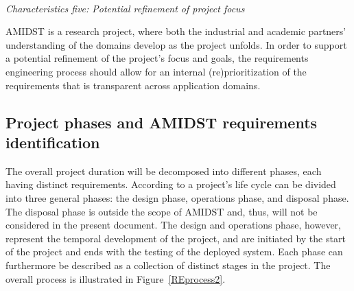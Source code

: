 
\ \\
\noindent \emph{Characteristics five: Potential refinement of project focus}
\label{sec:characteristic5}

AMIDST is a research project, where both the industrial and academic partners' understanding of the domains develop as
the project unfolds. In order to support a potential refinement of the project's focus and goals, the requirements
engineering process should allow for an internal (re)prioritization of the requirements that is transparent across
application domains.    





\subsection{Project phases and AMIDST requirements identification }


The overall project duration will be decomposed into different phases, each having distinct requirements. According to
\cite{Eig09} a project's life cycle can be divided into three general phases: the design phase, operations phase, and
disposal phase. The disposal phase is outside the scope of AMIDST and, thus, will not be considered in the present
document. The design and operations phase, however, represent the
temporal development of the project, and are initiated by the start of the project and ends with the testing of the
deployed system. Each
phase can furthermore be described as a collection of distinct stages in the project. The overall process is
illustrated in Figure~\ref{REprocess2}. 


